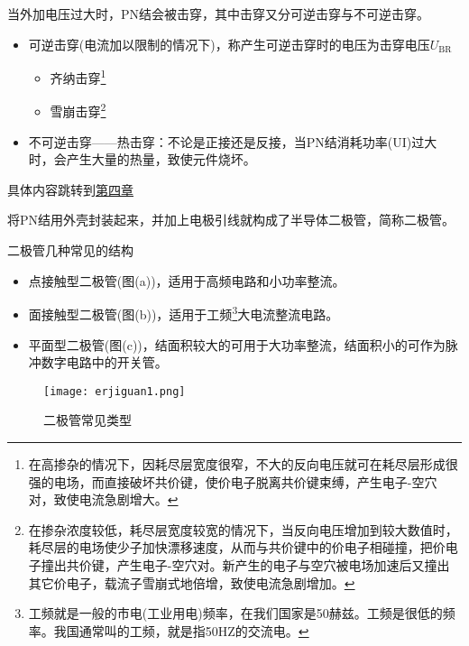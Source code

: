 \documentclass[cn,pad,11pt,geye]{elegantnote}
\begin{document}
\begin{proposition}[击穿电压]\label{jichuan}
	当外加电压过大时，PN结会被击穿，其中击穿又分可逆击穿与不可逆击穿。
	\begin{itemize}
		\item 可逆击穿(电流加以限制的情况下)，称产生可逆击穿时的电压为击穿电压$U_{\textrm{BR}}$
		\begin{itemize}
			\item 齐纳击穿\footnote{在高掺杂的情况下，因耗尽层宽度很窄，不大的反向电压就可在耗尽层形成很强的电场，而直接破坏共价键，使价电子脱离共价键束缚，产生电子-空穴对，致使电流急剧增大。}
			\item 雪崩击穿\footnote{在掺杂浓度较低，耗尽层宽度较宽的情况下，当反向电压增加到较大数值时，耗尽层的电场使少子加快漂移速度，从而与共价键中的价电子相碰撞，把价电子撞出共价键，产生电子-空穴对。新产生的电子与空穴被电场加速后又撞出其它价电子，载流子雪崩式地倍增，致使电流急剧增加。}
		\end{itemize}
		\item 不可逆击穿——热击穿：不论是正接还是反接，当PN结消耗功率(UI)过大时，会产生大量的热量，致使元件烧坏。
	\end{itemize}
\end{proposition}
\begin{definition}[PN结等效的电容]\label{dianrong}
	具体内容跳转到\hyperref[disizhang]{第四章}
\end{definition}
\begin{definition}[半导体二极管]
	将PN结用外壳封装起来，并加上电极引线就构成了半导体二极管，简称二极管。
\end{definition}
\begin{case}
	二极管几种常见的结构
	\begin{itemize}
		\item 点接触型二极管(图(a))，适用于高频电路和小功率整流。
		\item 面接触型二极管(图(b))，适用于工频\footnote{工频就是一般的市电(工业用电)频率，在我们国家是50赫兹。工频是很低的频率。我国通常叫的工频，就是指50HZ的交流电。}大电流整流电路。
		\item 平面型二极管(图(c))，结面积较大的可用于大功率整流，结面积小的可作为脉冲数字电路中的开关管。
	\end{itemize}
\end{case}
\begin{figure}[h]
	\centering
	\texttt{[image: erjiguan1.png]}
	\caption{二极管常见类型}
\end{figure}
\end{document}
